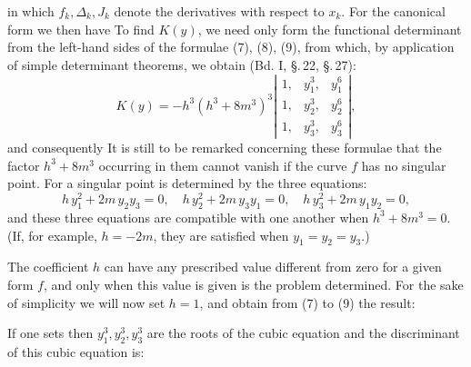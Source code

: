 in which $f_k,\Delta_k,J_k$ denote the derivatives with respect to $x_k$. For the canonical form we then have
To find $K(y)$, we need only form the functional determinant from the left-hand sides of the formulae (7), (8), (9), from which, by application of simple determinant theorems, we obtain (Bd. I, \S.\,22, \S.\,27):
\[
K(y) = -h^3(h^3+8m^3)^3 \left|\begin{array}{ccc} 1, & y_1^3, & y_1^6 \\ 1, & y_2^3, & y_2^6 \\ 1, & y_3^3, & y_3^6 \end{array}\right|,
\]
and consequently
It is still to be remarked concerning these formulae that the factor $h^3+8m^3$ occurring in them cannot vanish if the curve $f$ has no singular point. For a singular point is determined by the three equations:
\[
h\,y_1^2 + 2m\,y_2y_3 = 0,\quad h\,y_2^2 + 2m\,y_3y_1 = 0,\quad h\,y_3^2 + 2m\,y_1y_2 = 0,
\]
and these three equations are compatible with one another when $h^3+8m^3=0$. (If, for example, $h=-2m$, they are satisfied when $y_1=y_2=y_3$.)

The coefficient $h$ can have any prescribed value different from zero for a given form $f$, and only when this value is given is the problem determined. For the sake of simplicity we will now set $h=1$, and obtain from (7) to (9) the result:

If one sets
then $y_1^3,y_2^3,y_3^3$ are the roots of the cubic equation
and the discriminant of this cubic equation is:
